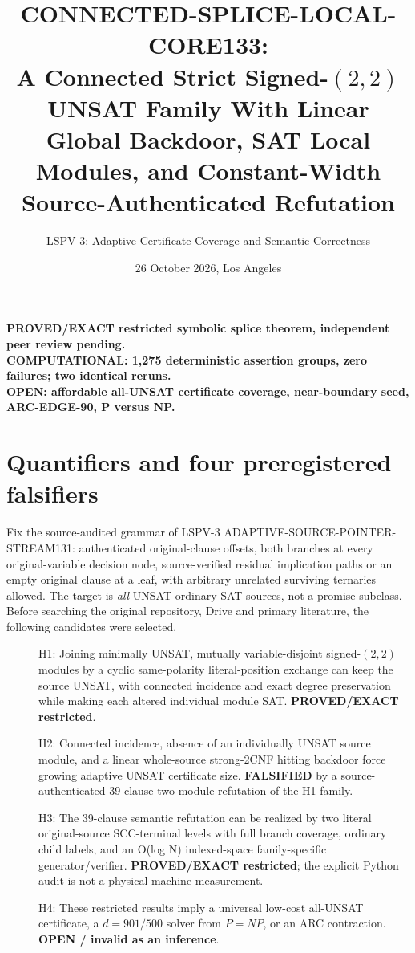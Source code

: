 \documentclass[11pt]{article}
\title{CONNECTED-SPLICE-LOCAL-CORE133:\\A Connected Strict Signed-$(2,2)$ UNSAT Family With Linear Global Backdoor, SAT Local Modules, and Constant-Width Source-Authenticated Refutation}
\author{LSPV-3: Adaptive Certificate Coverage and Semantic Correctness}
\date{26 October 2026, Los Angeles}
\begin{document}
\maketitle
\begin{center}
\textbf{PROVED/EXACT restricted symbolic splice theorem, independent peer review pending.}\\
\textbf{COMPUTATIONAL: 1,275 deterministic assertion groups, zero failures; two identical reruns.}\\
\textbf{OPEN: affordable all-UNSAT certificate coverage, near-boundary seed, ARC-EDGE-90, P versus NP.}
\end{center}

\section{Quantifiers and four preregistered falsifiers}
Fix the source-audited grammar of LSPV-3 ADAPTIVE-SOURCE-POINTER-STREAM131: authenticated original-clause offsets, both branches at every original-variable decision node, source-verified residual implication paths or an empty original clause at a leaf, with arbitrary unrelated surviving ternaries allowed. The target is \emph{all} UNSAT ordinary SAT sources, not a promise subclass. Before searching the original repository, Drive and primary literature, the following candidates were selected.
\begin{description}
\item[] H1: Joining minimally UNSAT, mutually variable-disjoint signed-$(2,2)$ modules by a cyclic same-polarity literal-position exchange can keep the source UNSAT, with connected incidence and exact degree preservation while making each altered individual module SAT. \textbf{PROVED/EXACT restricted}.
\item[] H2: Connected incidence, absence of an individually UNSAT source module, and a linear whole-source strong-2CNF hitting backdoor force growing adaptive UNSAT certificate size. \textbf{FALSIFIED} by a source-authenticated 39-clause two-module refutation of the H1 family.
\item[] H3: The 39-clause semantic refutation can be realized by two literal original-source SCC-terminal levels with full branch coverage, ordinary child labels, and an O(log N) indexed-space family-specific generator/verifier. \textbf{PROVED/EXACT restricted}; the explicit Python audit is not a physical machine measurement.
\item[] H4: These restricted results imply a universal low-cost all-UNSAT certificate, a $d=901/500$ solver from $P=NP$, or an ARC contraction. \textbf{OPEN / invalid as an inference}.
\end{description}
\end{document}
